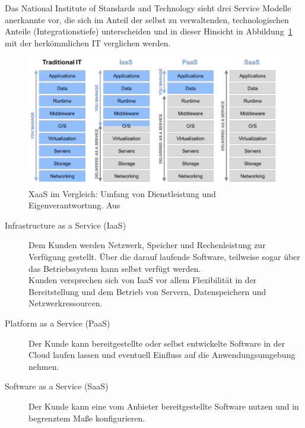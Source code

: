 Das National Institute of Standards and Technology sieht drei
Service Modelle anerkannte vor, die sich im Anteil der
selbst zu verwaltenden, technologischen Anteile (Integrationstiefe)
unterscheiden und in dieser Hinsicht in Abbildung~\ref{fig:xaas_im_vergleich}
mit der herkömmlichen IT verglichen werden.  \\
\begin{figure}%
\begin{center}
\includegraphics[width=\textwidth]{images/XaaS_im_Vergleich.png}
\caption{XaaS im Vergleich: Umfang von
Dienstleistung und Eigenverantwortung. Aus
\protect{} }
\label{fig:xaas_im_vergleich}
\end{center}
\end{figure}
\begin{description}
	\item[Infrastructure as a Service (IaaS)] Dem Kunden werden Netzwerk,
Speicher und Rechenleistung zur Verfügung gestellt. Über die darauf laufende
Software, teilweise sogar über das Betriebssystem kann selbst verfügt werden. \\
Kunden versprechen sich von IaaS vor allem Flexibilität in der Bereitstellung
und dem Betrieb von Servern, Datenspeichern und Netzwerkressourcen.
	\item[Platform as a Service (PaaS)] Der Kunde kann bereitgestellte
oder selbst entwickelte Software in der Cloud laufen lassen und eventuell
Einfluss auf die Anwendungsumgebung nehmen. \\
	\item[Software as a Service (SaaS)] Der Kunde kann eine vom Anbieter
bereitgestellte Software nutzen und in begrenztem Maße konfigurieren.
\end{description}





